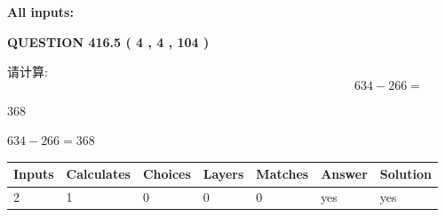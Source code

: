 \documentclass{ctexart}
\begin{document}
   
   
   
\noindent{}
   
   
   
   
\noindent\vspace{0.1in}\hspace{-0.08in} {\textbf{\Large{All inputs: }}}
   
   
  
\vspace{0.2in}
  
{\textbf{\Large{QUESTION
416.5 
 ( 4 , 4 , 104 )
}}}
  
  
 
请计算:
\begin{equation}
634 -   %
266 = \nonumber
\end{equation}
 
 
 
\noindent{}
 
 

368
 
 
\noindent{}
 
 

 
 
 
\noindent{}
 
 

$ %
634 -  %
266=   %
368$
 
 
\noindent{}
 
 

 
   
   
   
   
\noindent\begin{tabular}{|l|l|l|l|l|l|l|}
 \hline
Inputs & Calculates & Choices & Layers & Matches & Answer & Solution \\ \hline
 2  & 
 1  & 
 0
  & 
 0  & 
 0  & 
  yes & 
  yes 
  \\ \hline
 \end{tabular}
   
   
   
   
\noindent{}
   
\end{document}
